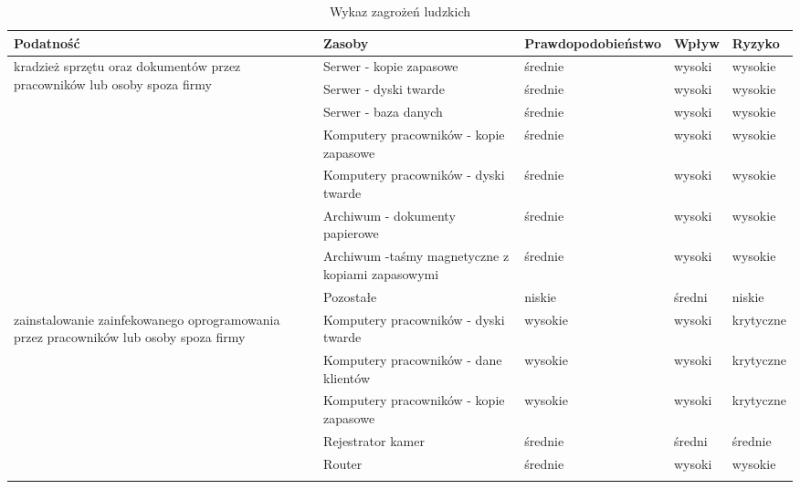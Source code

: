 \begin{landscape}
\begin{longtable}[!ht]{|m{4cm}|m{6cm}|m{4.5cm}|m{3cm}|m{3cm}|}
	\caption{Wykaz zagrożeń ludzkich}
	\label{tab::zagrozenia_ludzkie} \\
		\hline
		\textbf{Podatność} & \textbf{Zasoby} & \textbf{Prawdopodobieństwo} & \textbf{Wpływ} &  \textbf{Ryzyko} \\ \hline
		\multirow{8}{4cm}{kradzież sprzętu oraz dokumentów przez pracowników lub osoby spoza firmy}             & Serwer - kopie zapasowe                           & średnie            & wysoki & wysokie       \\ \cline{2-5} 
		& Serwer - dyski twarde                             & średnie            & wysoki & wysokie       \\ \cline{2-5} 
		& Serwer - baza danych                              & średnie            & wysoki & wysokie       \\ \cline{2-5} 
		& Komputery pracowników - kopie zapasowe            & średnie            & wysoki & wysokie       \\ \cline{2-5} 
		& Komputery pracowników - dyski twarde              & średnie            & wysoki & wysokie       \\ \cline{2-5} 
		& Archiwum - dokumenty papierowe                    & średnie            & wysoki & wysokie       \\ \cline{2-5} 
		& Archiwum -taśmy magnetyczne z kopiami zapasowymi  & średnie            & wysoki & wysokie       \\ \cline{2-5} 
		& Pozostałe                                         & niskie             & średni & niskie        \\ \hline
		\multirow{7}{4cm}{zainstalowanie zainfekowanego oprogramowania przez pracowników lub osoby spoza firmy} & Komputery pracowników - dyski twarde              & wysokie            & wysoki & krytyczne     \\ \cline{2-5} 
		& Komputery pracowników - dane klientów             & wysokie            & wysoki & krytyczne     \\ \cline{2-5} 
		& Komputery pracowników - kopie zapasowe            & wysokie            & wysoki & krytyczne     \\ \cline{2-5} 
		& Rejestrator kamer                                 & średnie            & średni & średnie       \\ \cline{2-5} 
		& Router                                            & średnie            & wysoki & wysokie       \\ \cline{2-5} 

\end{longtable}
\end{landscape}
